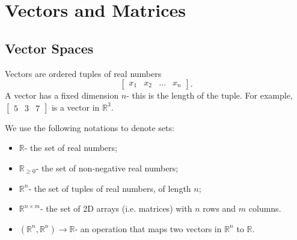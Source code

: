 \documentclass[a4paper, openany]{memoir}
\begin{document}
    \chapter{Vectors and Matrices}
    \section{Vector Spaces}
    Vectors are ordered tuples of real numbers
    \[\begin{bmatrix}
        x_1 & x_2 & \dots & x_n
    \end{bmatrix}.\]
    A vector has a fixed dimension $n$- this is the length of the tuple. For example, $\begin{bmatrix}
        5 & 3 & 7
    \end{bmatrix}$ is a vector in $\mathbb{R}^3$.

    We use the following notations to denote sets:
    \begin{itemize}
        \item $\mathbb{R}$- the set of real numbers;
        \item $\mathbb{R}_{\geq 0}$- the set of non-negative real numbers;
        \item $\mathbb{R}^n$- the set of tuples of real numbers, of length $n$;
        \item $\mathbb{R}^{n \times m}$- the set of 2D arrays (i.e. matrices) with $n$ rows and $m$ columns.
        \item $(\mathbb{R}^n, \mathbb{R}^n) \to \mathbb{R}$- an operation that maps two vectors in $\mathbb{R}^n$ to $\mathbb{R}$.
    \end{itemize}
\end{document}
